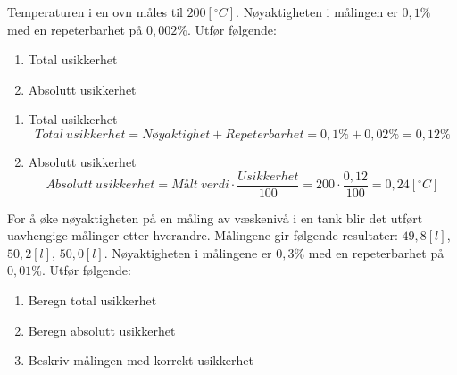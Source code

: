 \vspace{0.5cm} %



\begin{question}[name=Oppgave, topic=måleusikkerhet]
Temperaturen i en ovn måles til $200 [^\circ C]$. Nøyaktigheten i målingen er $0,1 \% $  med en repeterbarhet på $0,002 \%$. Utfør følgende:


	\begin{enumerate}[label=\roman*)]
		\item Total usikkerhet
		\item Absolutt usikkerhet
	\end{enumerate}


\end{question}

\vspace{0.5cm} %

\begin{solution}[name=Løsningsforslag oppgave]
	\begin{enumerate}[label=\roman*)]
		\item Total usikkerhet
\[Total\ usikkerhet = Nøyaktighet + Repeterbarhet = 0,1 \% + 0,02 \% = 0,12 \% \]
		\item Absolutt usikkerhet
\[Absolutt\ usikkerhet = M\text{å}lt\ verdi \cdot \frac{Usikkerhet}{100}=200 \cdot \frac{0,12}{100}=0,24 [^\circ C]\]
	\end{enumerate}
\end{solution}

\vspace{0.5cm} %




\begin{question}[name=Oppgave, topic=måleusikkerhet]
For å øke nøyaktigheten på en måling av væskenivå i en tank blir det utført uavhengige målinger etter hverandre. Målingene gir følgende resultater: $49,8[l]$, $50,2[l]$, $50,0[l]$. Nøyaktigheten i målingene er $0,3 \%$ med en repeterbarhet på $0,01 \%$. Utfør følgende:

	\begin{enumerate}[label=\roman*)]
		\item Beregn total usikkerhet
		\item Beregn absolutt usikkerhet
		\item Beskriv målingen med korrekt usikkerhet
	\end{enumerate}


\end{question}

